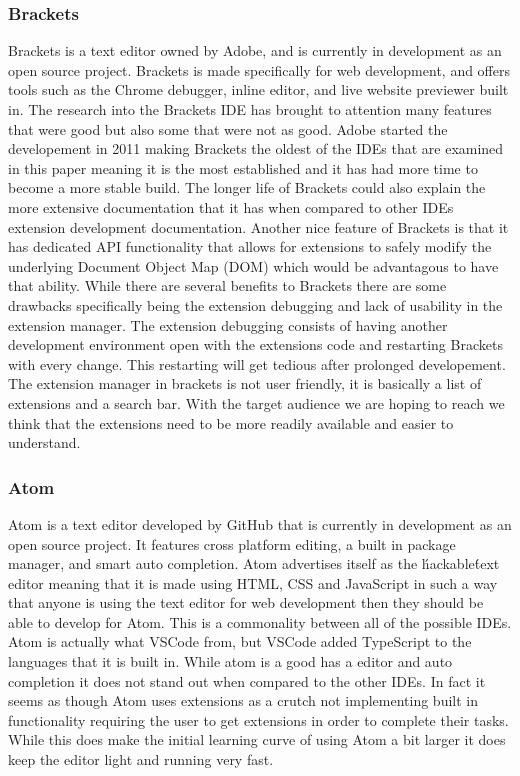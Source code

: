 \documentclass[letterpaper,10pt,titlepage,draftclsnofoot,onecolumn,onesided] {IEEEtran}
\begin{document}
\subsubsection{Brackets}
Brackets is a text editor owned by Adobe, and is currently in development as an open source project. \cite{Brackets}
Brackets is made specifically for web development, and offers tools such as the Chrome debugger, inline editor, and live website previewer built in.
The research into the Brackets IDE has brought to attention many features that were good but also some that were not as good.
Adobe started the developement in 2011 making Brackets the oldest of the IDEs that are examined in this paper meaning it is the most established and it has had more time to become a more stable build. 
The longer life of Brackets could also explain the more extensive documentation that it has when compared to other IDEs extension development documentation.
Another nice feature of Brackets is that it has dedicated API functionality that allows for extensions to safely modify the underlying Document Object Map (DOM) which would be advantagous to have that ability.
While there are several benefits to Brackets there are some drawbacks specifically being the extension debugging and lack of usability in the extension manager. 
The extension debugging consists of having another development environment open with the extensions code and restarting Brackets with every change.
This restarting will get tedious after prolonged developement.
The extension manager in brackets is not user friendly, it is basically a list of extensions and a search bar.
With the target audience we are hoping to reach we think that the extensions need to be more readily available and easier to understand. 

\subsubsection{Atom}
Atom is a text editor developed by GitHub that is currently in development as an open source project. 
It features cross platform editing, a built in package manager, and smart auto completion.
Atom advertises itself as the \'hackable\' text editor meaning that it is made using HTML, CSS and JavaScript in such a way that anyone is using the text editor for web development then they should be able to develop for Atom. \cite{Atom}
This is a commonality between all of the possible IDEs.
Atom is actually what VSCode from, but VSCode added TypeScript to the languages that it is built in.
While atom is a good has a editor and auto completion it does not stand out when compared to the other IDEs. 
In fact it seems as though Atom uses extensions as a crutch not implementing built in functionality requiring the user to get extensions in order to complete their tasks. 
While this does make the initial learning curve of using Atom a bit larger it does keep the editor light and running very fast.
\end{document}
